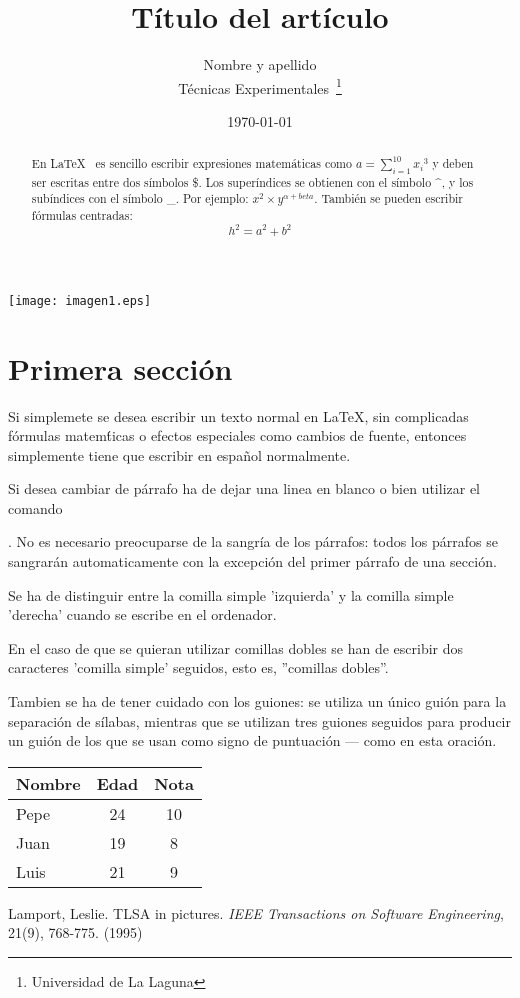 \documentclass[a4paper,12pt]{article}
\begin{document}
\texttt{[image: imagen1.eps]}

\title{Título del artículo}
\author{Nombre y apellido \\
        Técnicas Experimentales~\footnote{Universidad de La Laguna}
        }
\date {\today}
\maketitle
\begin{abstract}
  En \LaTeX{}~\cite{Lam:86} es sencillo escribir expresiones
  matemáticas como $a=\sum_{i=1}^{10} {x_i}^{3}$
  y deben ser escritas entre dos símbolos \$.
  Los superíndices se obtienen con el símbolo \^{}, y
  los subíndices con el símbolo \_.
  Por ejemplo: $x^2 \times y^{\alpha + beta}$.
  También se pueden escribir fórmulas centradas:
  \[h^2=a^2 + b^2 \]
\end{abstract}

\section{Primera sección}
  
Si simplemete se desea escribir un texto normal en LaTeX,
sin complicadas f\'ormulas matem\'ticas o efectos especiales
como cambios de fuente, entonces simplemente tiene que escribir
en espa\~nol normalmente.\par
Si desea cambiar de párrafo ha de dejar una linea en blanco o bien
utilizar el comando\par.
No es necesario preo\-cu\-parse de la san\-gría de los pá\-rra\-fos:
todos los párrafos se sangrarán automaticamente con la excepción
del primer párrafo de una sección.

Se ha de distinguir entre la comilla simple 'izquierda'
y la comilla simple 'derecha' cuando se escribe en el ordenador.

En el caso de que se quieran utilizar comillas dobles se han de
escribir dos caracteres 'comilla simple' seguidos, esto es,
''comillas dobles''.

Tambien se ha de tener cuidado con los guiones: se utiliza un único
guión para la separación de sílabas, mientras que se utilizan
tres guiones seguidos para producir un guión de los que se usan
como signo de puntuación --- como en esta oración.

\bigskip
\begin{tabular}{|l|c|c|}
\hline
  Nombre & Edad & Nota \\ \hline
  Pepe   &   24 &   10 \\ \hline
  Juan   &   19 &    8 \\ \hline
  Luis   &   21 &    9 \\ \hline
\end{tabular}

\begin{thebibliography}{00}
  Lamport, Leslie.
  TLSA in pictures.
  \emph{IEEE Transactions on Software Engineering},
  21(9), 768-775.
  (1995)
\end{thebibliography}
\end{document}
